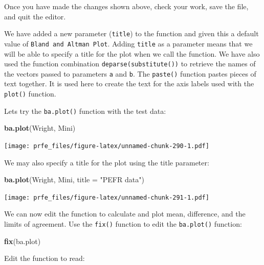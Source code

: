 \documentclass[12pt,]{book}
\newenvironment{Shaded}{\begin{snugshade}}{\end{snugshade}}
\newcommand{\KeywordTok}[1]{\textcolor[rgb]{0.13,0.29,0.53}{\textbf{#1}}}
\newcommand{\DataTypeTok}[1]{\textcolor[rgb]{0.13,0.29,0.53}{#1}}
\newcommand{\StringTok}[1]{\textcolor[rgb]{0.31,0.60,0.02}{#1}}
\newcommand{\NormalTok}[1]{#1}
\theoremstyle{definition}
\theoremstyle{definition}
\theoremstyle{definition}
\theoremstyle{remark}
\begin{document}
Once you have made the changes shown above, check your work, save the
file, and quit the editor.

We have added a new parameter (\texttt{title}) to the function and given
this a default value of \texttt{Bland\ and\ Altman\ Plot}. Adding
\texttt{title} as a parameter means that we will be able to specify a
title for the plot when we call the function. We have also used the
function combination \texttt{deparse(substitute())} to retrieve the
names of the vectors passed to parameters \texttt{a} and \texttt{b}. The
\texttt{paste()} function pastes pieces of text together. It is used
here to create the text for the axis labels used with the
\texttt{plot()} function.

Lets try the \texttt{ba.plot()} function with the test data:

\begin{Shaded}
\begin{Highlighting}[]
\KeywordTok{ba.plot}\NormalTok{(Wright, Mini)}
\end{Highlighting}
\end{Shaded}

\texttt{[image: prfe\_files/figure-latex/unnamed-chunk-290-1.pdf]}

We may also specify a title for the plot using the title parameter:

\begin{Shaded}
\begin{Highlighting}[]
\KeywordTok{ba.plot}\NormalTok{(Wright, Mini, }\DataTypeTok{title =} \StringTok{"PEFR data"}\NormalTok{)}
\end{Highlighting}
\end{Shaded}

\texttt{[image: prfe\_files/figure-latex/unnamed-chunk-291-1.pdf]}

We can now edit the function to calculate and plot mean, difference, and
the limits of agreement. Use the \texttt{fix()} function to edit the
\texttt{ba.plot()} function:

\begin{Shaded}
\begin{Highlighting}[]
\KeywordTok{fix}\NormalTok{(ba.plot)}
\end{Highlighting}
\end{Shaded}

Edit the function to read:
\end{document}
